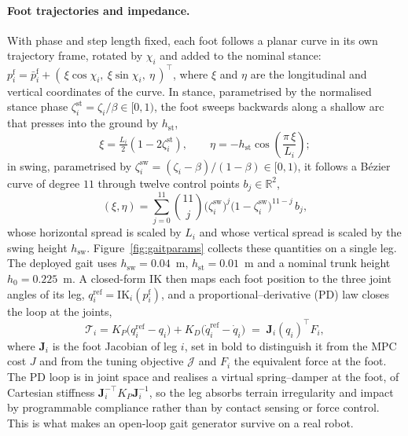 \documentclass[11pt,a4paper]{article}
\newcommand{\R}{\mathbb{R}}
\newcommand{\pf}{p^{\mathrm{f}}}
\begin{document}
\paragraph{Foot trajectories and impedance.} With phase and step length fixed, each foot follows a planar
curve in its own trajectory frame, rotated by $\chi_i$ and added to the nominal stance:
$\pf_i=\bar\pf_i+(\,\xi\cos\chi_i,\ \xi\sin\chi_i,\ \eta\,)^{\!\top}$, where $\xi$ and $\eta$ are the
longitudinal and vertical coordinates of the curve. In stance, parametrised by the normalised stance phase
$\zeta_i^{\mathrm{st}}=\zeta_i/\beta\in[0,1)$, the foot sweeps backwards along a shallow arc that presses into
the ground by $h_{\mathrm{st}}$,
\begin{equation}
  \xi=\tfrac{L_i}{2}\left(1-2\zeta_i^{\mathrm{st}}\right),\qquad
  \eta=-h_{\mathrm{st}}\cos\!\left(\frac{\pi\,\xi}{L_i}\right);
  \label{eq:stance}
\end{equation}
in swing, parametrised by $\zeta_i^{\mathrm{sw}}=(\zeta_i-\beta)/(1-\beta)\in[0,1)$, it follows a Bézier curve
of degree $11$ through twelve control points $b_j\in\R^2$,
\begin{equation}
  (\xi,\eta)=\sum_{j=0}^{11}\binom{11}{j}
             \big(\zeta_i^{\mathrm{sw}}\big)^{j}\big(1-\zeta_i^{\mathrm{sw}}\big)^{11-j}\,b_j,
  \label{eq:swing}
\end{equation}
whose horizontal spread is scaled by $L_i$ and whose vertical spread is scaled by the swing height
$h_{\mathrm{sw}}$. Figure~\ref{fig:gaitparams} collects these quantities on a single leg. The deployed gait uses $h_{\mathrm{sw}}=0.04$~m, $h_{\mathrm{st}}=0.01$~m and a nominal
trunk height $h_0=0.225$~m. A closed-form IK then maps each foot position to the three joint angles of its
leg, $q_i^{\mathrm{ref}}=\mathrm{IK}_i(\pf_i)$, and a proportional--derivative (PD) law closes the loop at the
joints,
\begin{equation}
  \mathcal{T}_i = K_P\big(q_i^{\mathrm{ref}}-q_i\big)+K_D\big(\dot q_i^{\mathrm{ref}}-\dot q_i\big)
  \;=\;\bm{J}_i(q_i)^{\!\top}F_i,
  \label{eq:impedance}
\end{equation}
where $\bm{J}_i$ is the foot Jacobian of leg $i$, set in bold to distinguish it from the MPC cost $J$ and
from the tuning objective $\mathcal{J}$ and $F_i$ the equivalent force at the
foot. The PD loop is in joint space and
realises a virtual spring--damper at the foot, of Cartesian stiffness
$\bm{J}_i^{-\top}K_P\bm{J}_i^{-1}$, so the leg absorbs terrain irregularity and impact by
programmable compliance rather than by contact sensing or force control. This is what makes an open-loop gait
generator survive on a real robot.
\end{document}
